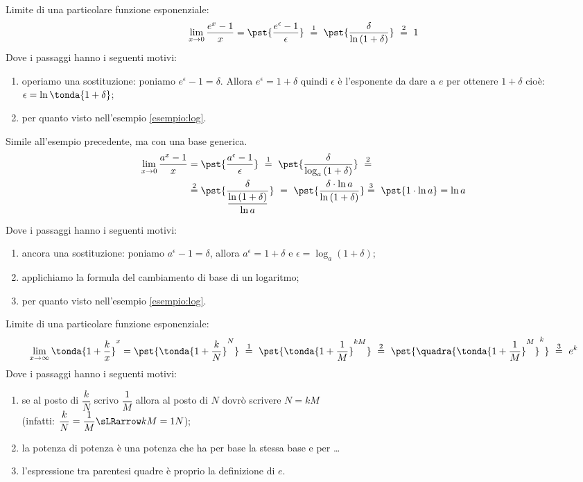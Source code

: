 \begin{esempio}
Limite di una particolare funzione esponenziale:
\[
\lim_{x \rightarrow 0} \dfrac{e^x-1}{x} =
\pst{\dfrac{e^\epsilon-1}{\epsilon}}
~ \stackrel{1}{=} ~  
\pst{\dfrac{\delta}{\ln{(1 + \delta)}}}~ \stackrel{2}{=} ~ 1
\]
Dove i passaggi hanno i seguenti motivi:
\begin{enumerate} [nosep]
 \item operiamo una sostituzione: poniamo \(e^\epsilon-1=\delta\). 
Allora \(e^\epsilon = 1+\delta\) quindi \(\epsilon\) è l'esponente da dare 
a \(e\) per ottenere \(1+\delta\) cioè: 
\(\epsilon = \ln{\tonda{1+\delta}}\);
 \item per quanto visto nell'esempio \ref{esempio:log}.
\end{enumerate}
\end{esempio}

\begin{esempio}
Simile all'esempio precedente, ma con una base generica.
\begin{align*}
\lim_{x \rightarrow 0} \dfrac{a^x-1}{x} &=
\pst{\dfrac{a^\epsilon-1}{\epsilon}}
~ \stackrel{1}{=} ~  
\pst{\dfrac{\delta}{\log_a{(1 + \delta)}}}~ \stackrel{2}{=}\\
&\stackrel{2}{=} 
\pst{\frac{\delta}{\dfrac{\ln{(1 + \delta)}}{\ln a}}} ~=~
\pst{\frac{\delta \cdot \ln a}{\ln{(1 + \delta)}}} %
\stackrel{3}{=} ~ 
\pst{1 \cdot \ln a}=\ln{a}
\end{align*}

Dove i passaggi hanno i seguenti motivi:
\begin{enumerate} [nosep]
 \item ancora una sostituzione: poniamo
\(a^\epsilon-1=\delta\), allora \(a^\epsilon= 1 + \delta\) e 
\(\epsilon=\log_a(1 + \delta)\);
 \item applichiamo la formula del cambiamento di base di un logaritmo; 
 \item per quanto visto nell'esempio \ref{esempio:log}.
\end{enumerate}
\end{esempio}

\begin{esempio}
Limite di una particolare funzione esponenziale:
\[
 \lim_{x \rightarrow \infty} \tonda{1+\dfrac{k}{x}}^x =
 \pst{\tonda{1+\dfrac{k}{N}}^N}
~ \stackrel{1}{=} ~  
\pst{\tonda{1+\dfrac{1}{M}}^{kM}}
~ \stackrel{2}{=} ~
\pst{\quadra{\tonda{1+\dfrac{1}{M}}^M}^k}
~ \stackrel{3}{=} ~ e^k
\]
Dove i passaggi hanno i seguenti motivi:
\begin{enumerate} [nosep]
 \item se al posto di \(\dfrac{k}{N}\) scrivo \(\dfrac{1}{M}\) 
allora al posto di \(N\) dovrò scrivere \(N=kM\)\\ 
(infatti: \(\dfrac{k}{N}=\dfrac{1}{M} \sLRarrow kM=1N\));
 \item la potenza di potenza è una potenza che ha per base la stessa base 
e per \dots
 \item l'espressione tra parentesi quadre è proprio la definizione di \(e\).
\end{enumerate}
\end{esempio}


